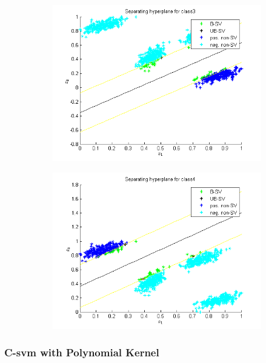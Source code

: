 \documentclass{article}
\begin{document}
\begin{figure}
\begin{subfigure}{.5\textwidth}
  \centering
  \includegraphics[width=.8\linewidth]{Classification/1a/c_linear/hc3}
 
\end{subfigure}%
\begin{subfigure}{.5\textwidth}
  \centering
  \includegraphics[width=.8\linewidth]{Classification/1a/c_linear/hc4}
  
\end{subfigure}
\end{figure}

\subsubsection{C-svm with Polynomial Kernel}
\end{document}
